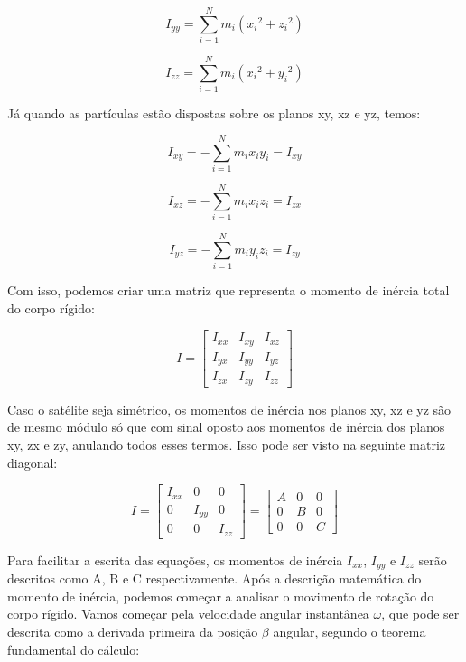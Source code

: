 \begin{equation}
  I_{yy}=\sum_{i=1}^{N}{m_i({x_i}^{2}+{z_i}^{2})}
\end{equation}

\begin{equation}
  I_{zz}=\sum_{i=1}^{N}{m_i({x_i}^{2}+{y_i}^{2})}
\end{equation}

Já quando as partículas estão dispostas sobre os planos xy, xz e yz, temos:

\begin{equation}
  I_{xy}=-\sum_{i=1}^{N}{m_ix_iy_i}=I_{xy}
\end{equation}

\begin{equation}
  I_{xz}=-\sum_{i=1}^{N}{m_ix_iz_i}=I_{zx}
\end{equation}

\begin{equation}
  I_{yz}=-\sum_{i=1}^{N}{m_iy_iz_i}=I_{zy}
\end{equation}

Com isso, podemos criar uma matriz que representa o momento de inércia total do corpo rígido:

\begin{equation}\label{eq:nsimetrico}
I=\begin{bmatrix}I_{xx}&I_{xy}&I_{xz}\\I_{yx}&I_{yy}&I_{yz}\\I_{zx}&I_{zy}&I_{zz}\end{bmatrix}
\end{equation}

Caso o satélite seja simétrico, os momentos de inércia nos planos xy, xz e yz são de mesmo módulo só que com sinal oposto aos momentos de inércia dos planos xy, zx e zy, anulando todos esses termos. Isso pode ser visto na seguinte matriz diagonal:

\begin{equation}
I=\begin{bmatrix} I_{ xx } & 0 & 0 \\ 0 & I_{ yy } & 0 \\ 0 & 0 & I_{ zz } \end{bmatrix}=\begin{bmatrix} A & 0 & 0 \\ 0 & B & 0 \\ 0 & 0 & C \end{bmatrix}
\end{equation}

Para facilitar a escrita das equações, os momentos de inércia $I_{xx}$, $I_{yy}$ e $I_{zz}$ serão descritos como A, B e C respectivamente. Após a descrição matemática do momento de inércia, podemos começar a analisar o movimento de rotação do corpo rígido. Vamos começar pela velocidade angular instantânea $\omega$, que pode ser descrita como a derivada primeira da posição $\beta$ angular, segundo o teorema fundamental do cálculo:

